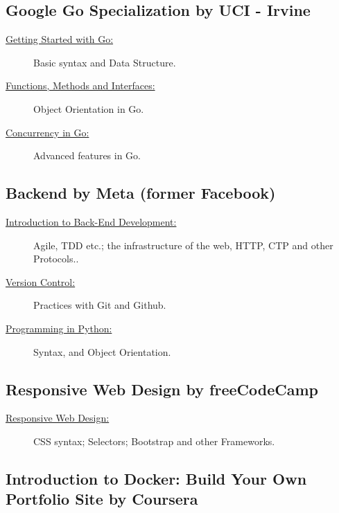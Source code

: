\documentclass[letterpaper]{../cls/twentysecondcvenglish} %
\begin{document}
\subsection{\textbf{Google Go Specialization by UCI - Irvine}}
\begin{description}
\item[\href{https://buddhilw.github.io/bug-free-fiesta/}{Getting Started with Go:}] Basic syntax and Data Structure.
\item[\href{https://buddhilw.github.io/bug-free-fiesta/}{Functions, Methods and Interfaces:}] Object Orientation in Go.
\item[\href{https://buddhilw.github.io/bug-free-fiesta/}{Concurrency in Go:}] Advanced features in Go.
\end{description}
\vspace{10mm}
\subsection{\textbf{Backend by Meta (former Facebook)}}
\begin{description}
\item[\href{https://buddhilw.github.io/bug-free-fiesta/}{Introduction to Back-End Development:}] Agile, TDD etc.; the infrastructure of the web, HTTP, CTP and other Protocols..
\item[\href{https://buddhilw.github.io/bug-free-fiesta/}{Version Control:}] Practices with Git and Github.
\item[\href{https://buddhilw.github.io/bug-free-fiesta/}{Programming in Python:}] Syntax, and Object Orientation.
\end{description}

\vspace{10mm}
\subsection{\textbf{Responsive Web Design by freeCodeCamp}}

\begin{description}
\item[\href{https://buddhilw.github.io/bug-free-fiesta/}{Responsive Web Design:}] CSS syntax; Selectors; Bootstrap and other Frameworks.
\end{description}

\vspace{10mm}
\subsection{\textbf{Introduction to Docker: Build Your Own Portfolio Site by Coursera}}
\end{document}
